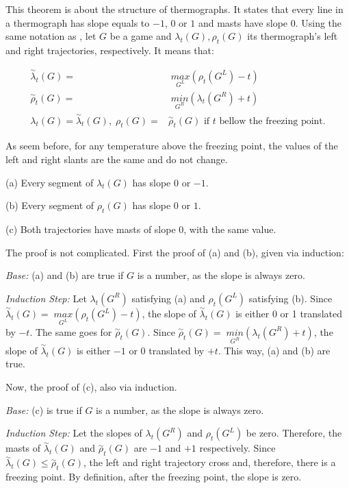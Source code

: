 This theorem is about the structure of thermographs. It states that every line in a thermograph has slope equals to ${-}1$, $0$ or $1$ and masts have slope 0. Using the same notation as , let $G$ be a game and $\lambda_t(G), \rho_t(G)$ its thermograph's left and right trajectories, respectively. It means that:

\begin{align*}
\overset{\sim}{\lambda}_t(G) =&\; \underset{G^L}{max}(\rho_t(G^L)- t)\\
\overset{\sim}{\rho}_t(G) =&\; \underset{G^R}{min}(\lambda_t(G^R) + t)\\
\lambda_t(G) = \overset{\sim}{\lambda}_t(G),\;\rho_t(G) =& \overset{\sim}{\rho}_t(G)\text{ if $t$ bellow the freezing point.}
\end{align*}

As seem before, for any temperature above the freezing point, the values of the left and right slants are the same and do not change. 

(a) Every segment of $\lambda_t(G)$ has slope 0 or ${-}1$.

(b) Every segment of $\rho_t(G)$ has slope 0 or $1$.

(c) Both trajectories have masts of slope 0, with the same value.

The proof is not complicated. First the proof of (a) and (b), given via induction:

\textit{Base:} (a) and (b) are true if $G$ is a number, as the slope is always zero.

\textit{Induction Step:} Let $\lambda_t(G^R)$ satisfying (a) and $\rho_t(G^L)$ satisfying (b). Since \mbox{$\overset{\sim}{\lambda}_t(G) =\; \underset{G^L}{max}(\rho_t(G^L)- t)$}, the slope of $\overset{\sim}{\lambda}_t(G)$ is either 0 or 1 translated by ${-}t$. The same goes for $\overset{\sim}{\rho}_t(G)$. Since \mbox{$\overset{\sim}{\rho}_t(G) =\; \underset{G^R}{min}(\lambda_t(G^R) + t)$}, the slope of $\overset{\sim}{\lambda}_t(G)$ is either ${-}1$ or 0 translated by ${+}t$. This way, (a) and (b) are true.

Now, the proof of (c), also via induction.

\textit{Base:} (c) is true if $G$ is a number, as the slope is always zero.

\textit{Induction Step:} Let the slopes of $\lambda_t(G^R)$ and $\rho_t(G^L)$ be zero. Therefore, the masts of $\overset{\sim}{\lambda}_t(G)$ and $\overset{\sim}{\rho}_t(G)$ are ${-}1$ and ${+}1$ respectively. Since $\overset{\sim}{\lambda}_t(G) \leq \overset{\sim}{\rho}_t(G)$, the left and right trajectory cross and, therefore, there is a freezing point. By definition, after the freezing point, the slope is zero.

